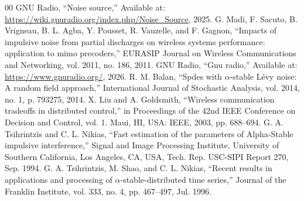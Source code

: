 \documentclass[conference]{IEEEtran}
\begin{document}
\begin{thebibliography}{00}
 {GNU Radio}, ``Noise source,'' Available at: \url{https://wiki.gnuradio.org/index.php/Noise_Source}, 2025.
 G. Madi, F. Sacuto, B. Vrigneau, B. L. Agba, Y. Pousset, R. Vauzelle, and F. Gagnon, ``Impacts of impulsive noise from partial discharges on wireless systems performance: application to mimo precoders,'' EURASIP Journal on Wireless Communications and Networking, vol. 2011, no. 186, 2011.
 {GNU Radio}, ``Gnu radio,'' Available at: \url{https://www.gnuradio.org/}, 2026.
 R. M. Balan, ``Spdes with {${\alpha}$}-stable {L{\'e}vy} noise: A random field approach,'' International Journal of Stochastic Analysis, vol. 2014, no. 1, p. 793275, 2014.
 X. Liu and A. Goldsmith, ``Wireless communication tradeoffs in distributed control,'' in Proceedings of the 42nd IEEE Conference on Decision and Control, vol. 1. Maui, HI, USA: IEEE, 2003, pp. 688--694.
 G. A. Tsihrintzis and C. L. Nikias, ``Fast estimation of the parameters of {Alpha-Stable} impulsive interference,'' Signal and Image Processing Institute, University of Southern California, Los Angeles, CA, USA, Tech. Rep. USC-SIPI Report 270, Sep. 1994.
 G. A. Tsihrintzis, M. Shao, and C. L. Nikias, ``Recent results in applications and processing of {${\alpha}$}-stable-distributed time series,'' Journal of the Franklin Institute, vol. 333, no. 4, pp. 467--497, Jul. 1996.
\end{thebibliography}
\end{document}
